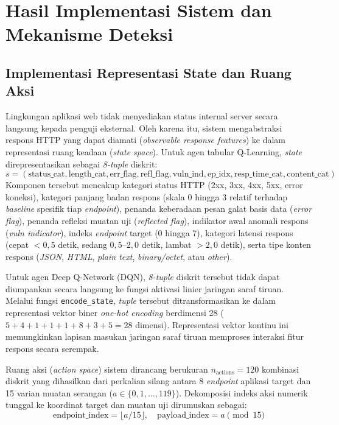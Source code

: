 \section{Hasil Implementasi Sistem dan Mekanisme Deteksi}

\subsection{Implementasi Representasi State dan Ruang Aksi}

Lingkungan aplikasi web tidak menyediakan status internal server secara langsung kepada penguji eksternal. Oleh karena itu, sistem mengabstraksi respons HTTP yang dapat diamati (\textit{observable response features}) ke dalam representasi ruang keadaan (\textit{state space}). Untuk agen tabular Q-Learning, \textit{state} direpresentasikan sebagai \textit{8-tuple} diskrit:
\begin{equation}
s = (\text{status\_cat}, \text{length\_cat}, \text{err\_flag}, \text{refl\_flag}, \text{vuln\_ind}, \text{ep\_idx}, \text{resp\_time\_cat}, \text{content\_cat})
\end{equation}
Komponen tersebut mencakup kategori status HTTP (2xx, 3xx, 4xx, 5xx, error koneksi), kategori panjang badan respons (skala 0 hingga 3 relatif terhadap \textit{baseline} spesifik tiap \textit{endpoint}), penanda keberadaan pesan galat basis data (\textit{error flag}), penanda refleksi muatan uji (\textit{reflected flag}), indikator awal anomali respons (\textit{vuln indicator}), indeks \textit{endpoint} target (0 hingga 7), kategori latensi respons (cepat $<0,5$ detik, sedang $0,5\text{--}2,0$ detik, lambat $>2,0$ detik), serta tipe konten respons (\textit{JSON}, \textit{HTML}, \textit{plain text}, \textit{binary/octet}, atau \textit{other}).

Untuk agen Deep Q-Network (DQN), \textit{8-tuple} diskrit tersebut tidak dapat diumpankan secara langsung ke fungsi aktivasi linier jaringan saraf tiruan. Melalui fungsi \texttt{encode\_state}, \textit{tuple} tersebut ditransformasikan ke dalam representasi vektor biner \textit{one-hot encoding} berdimensi 28 ($5 + 4 + 1 + 1 + 1 + 8 + 3 + 5 = 28$ dimensi). Representasi vektor kontinu ini memungkinkan lapisan masukan jaringan saraf tiruan memproses interaksi fitur respons secara serempak.

Ruang aksi (\textit{action space}) sistem dirancang berukuran $n_{\text{actions}} = 120$ kombinasi diskrit yang dihasilkan dari perkalian silang antara 8 \textit{endpoint} aplikasi target dan 15 varian muatan serangan ($a \in \{0, 1, \dots, 119\}$). Dekomposisi indeks aksi numerik tunggal ke koordinat target dan muatan uji dirumuskan sebagai:
\begin{equation}
\text{endpoint\_index} = \lfloor a / 15 \rfloor, \quad \text{payload\_index} = a \pmod{15}
\end{equation}

